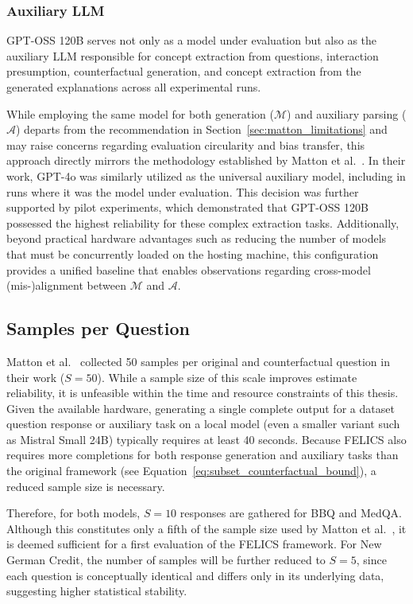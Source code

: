 \subsubsection{Auxiliary LLM}
GPT-OSS 120B serves not only as a model under evaluation but also as the auxiliary LLM responsible for concept extraction from questions, interaction presumption, counterfactual generation, and concept extraction from the generated explanations across all experimental runs.

While employing the same model for both generation ($\mathcal{M}$) and auxiliary parsing ($\mathcal{A}$) departs from the recommendation in Section~\ref{sec:matton_limitations} and may raise concerns regarding evaluation circularity and bias transfer, this approach directly mirrors the methodology established by Matton et al.~\cite{mattonWalkTalkMeasuring2024}. In their work, GPT-4o was similarly utilized as the universal auxiliary model, including in runs where it was the model under evaluation. This decision was further supported by pilot experiments, which demonstrated that GPT-OSS 120B possessed the highest reliability for these complex extraction tasks. Additionally, beyond practical hardware advantages such as reducing the number of models that must be concurrently loaded on the hosting machine, this configuration provides a unified baseline that enables observations regarding cross-model (mis-)alignment between $\mathcal{M}$ and $\mathcal{A}$.

\subsection{Samples per Question}
Matton et al.~\cite{mattonWalkTalkMeasuring2024} collected 50 samples per original and counterfactual question in their work ($S = 50$). While a sample size of this scale improves estimate reliability, it is unfeasible within the time and resource constraints of this thesis. Given the available hardware, generating a single complete output for a dataset question response or auxiliary task on a local model (even a smaller variant such as Mistral Small 24B) typically requires at least 40 seconds. Because FELICS also requires more completions for both response generation and auxiliary tasks than the original framework (see Equation~\ref{eq:subset_counterfactual_bound}), a reduced sample size is necessary.

Therefore, for both models, $S=10$ responses are gathered for BBQ and MedQA. Although this constitutes only a fifth of the sample size used by Matton et al.~\cite{mattonWalkTalkMeasuring2024}, it is deemed sufficient for a first evaluation of the FELICS framework. For New German Credit, the number of samples will be further reduced to $S=5$, since each question is conceptually identical and differs only in its underlying data, suggesting higher statistical stability.

